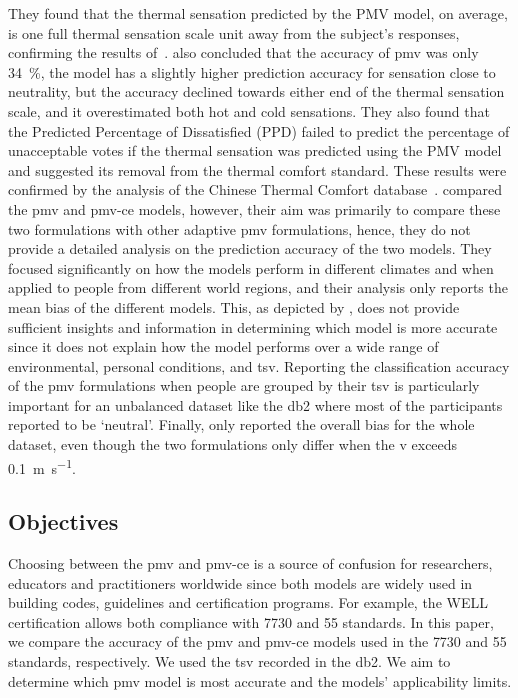 They found that the thermal sensation predicted by the PMV model, on average, is one full thermal sensation scale unit away from the subject’s responses, confirming the results of~.
 also concluded that the accuracy of \ac{pmv} was only \qty{34}{\percent}, the model has a slightly higher prediction accuracy for sensation close to neutrality, but the accuracy declined towards either end of the thermal sensation scale, and it overestimated both hot and cold sensations.
They also found that the Predicted Percentage of Dissatisfied (PPD) failed to predict the percentage of unacceptable votes if the thermal sensation was predicted using the PMV model and suggested its removal from the thermal comfort standard.
These results were confirmed by the analysis of the Chinese Thermal Comfort database~\cite{du_evaluation_2022}.
 compared the \ac{pmv} and \ac{pmv-ce} models, however, their aim was primarily to compare these two formulations with other adaptive \ac{pmv} formulations, hence, they do not provide a detailed analysis on the prediction accuracy of the two models.
They focused significantly on how the models perform in different climates and when applied to people from different world regions, and their analysis only reports the mean bias of the different models.
This, as depicted by , does not provide sufficient insights and information in determining which model is more accurate since it does not explain how the model performs over a wide range of environmental, personal conditions, and \ac{tsv}.
Reporting the classification accuracy of the \ac{pmv} formulations when people are grouped by their \ac{tsv} is particularly important for an unbalanced dataset like the \ac{db2} where most of the participants reported to be `neutral'.
Finally,  only reported the overall bias for the whole dataset, even though the two formulations only differ when the \ac{v} exceeds \qty{0.1}{\m\per\s}.

\subsection{Objectives}\label{subsec:aim-and-objectives}
Choosing between the \ac{pmv} and \ac{pmv-ce} is a source of confusion for researchers, educators and practitioners worldwide since both models are widely used in building codes, guidelines and certification programs.
For example, the WELL certification allows both compliance with \gls{7730} and \gls{55} standards.
In this paper, we compare the accuracy of the \ac{pmv} and \ac{pmv-ce} models used in the \gls{7730} and \gls{55} standards, respectively.
We used the \ac{tsv} recorded in the \acf{db2}.
We aim to determine which \ac{pmv} model is most accurate and the models' applicability limits.